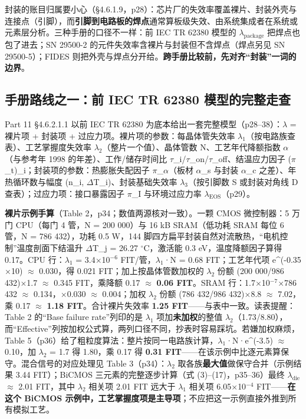 封装的账目归属要小心（§4.6.1.9，p28）：芯片厂的失效率覆盖裸片、封装外壳与连接点（引脚），而\textbf{引脚到电路板的焊点}通常算板级失效、由系统集成者在系统或元素层分析。三种手册的口径不一样：前 IEC TR 62380 模型的 \(\lambda_{\mathrm{package}}\) 把焊点也包了进去；SN 29500-2 的元件失效率含裸片与封装但不含焊点（焊点另见 SN 29500-5）；FIDES 则把外壳与焊点分开给。\textbf{跨手册比较前，先对齐“封装”一词的边界}。

\subsection{手册路线之一：前 IEC TR 62380 模型的完整走查}

Part 11 §4.6.2.1.1 以前 IEC TR 62380 为底本给出一套完整模型（p28–38）：\(\lambda\) = 裸片项 + 封装项 + 过应力项。裸片项的参数：每晶体管失效率 \(\lambda\)\(_{1}\)（按电路族查表）、工艺掌握度失效率 \(\lambda\)\(_{2}\)（整片一个值）、晶体管数 N、工艺年代降额指数 \(\alpha\)（与参考年 1998 的年差）、工作/储存时间比 \(\tau\)\_i/\(\tau\)\_on/\(\tau\)\_off、结温应力因子 (\(\pi\)\_t)\_i；封装项的参数：热膨胀失配因子 \(\pi\)\_\(\alpha\)（板材 \(\alpha\)\_s 与封装 \(\alpha\)\_c 之差）、年热循环数与幅度 (n\_i, \(\Delta\)T\_i)、封装基础失效率 \(\lambda\)\(_{3}\)（按引脚数 S 或封装对角线 D 查表）；过应力项：接口暴露因子 \(\pi\)\_I 与环境过应力率 \(\lambda_{\mathrm{EOS}}\)（p29）。

\textbf{裸片示例手算}（Table 2，p34；数值两源核对一致）。一颗 CMOS 微控制器：5 万门 CPU（每门 4 管，N = 200 000）与 16 kB SRAM（低功耗 SRAM 每位 6 管，N = 786 432），功耗 0.5 W，144 脚四方扁平封装自然对流散热，“电机控制”温度剖面下结温升 \(\Delta\)T\_j = 26.27 \(^{\circ}\)C，激活能 0.3 eV，温度降额因子算得 0.17。CPU 行：\(\lambda\)\(_{1}\) = 3.4\(\times\)10\(^{-6}\) FIT/管，\(\lambda\)\(_{1}\)·N = 0.68 FIT；工艺年代项 e\^{}(-0.35\(\times\)10) \(\approx\) 0.030，得 0.021 FIT；加上按晶体管数加权的 \(\lambda\)\(_{2}\) 份额 (200 000/986 432)\(\times\)1.7 \(\approx\) 0.345 FIT，乘降额 0.17 \(\approx\) \textbf{0.06 FIT}。SRAM 行：1.7\(\times\)10\(^{-7}\)\(\times\)786 432 \(\approx\) 0.134，\(\times\)0.030 \(\approx\) 0.004；加权 \(\lambda\)\(_{2}\) 份额 (786 432/986 432)\(\times\)8.8 \(\approx\) 7.02，乘 0.17 \(\approx\) \textbf{1.18 FIT}。合计裸片失效率 \textbf{1.25 FIT}——与表中一致。读表提醒：Table 2 的“Base failure rate”列印的是 \(\lambda\)\(_{1}\) 项加\textbf{未加权}的整值 \(\lambda\)\(_{2}\)（1.73/8.80），而“Effective”列按加权公式算，两列口径不同，抄表时容易踩坑。若嫌加权麻烦，Table 5（p36）给了粗粒度算法：整片按同一电路族计算，\(\lambda\)\(_{1}\)·N·e\^{}(-3.5) \(\approx\) 0.10，加 \(\lambda\)\(_{2}\) = 1.7 得 1.80，乘 0.17 得 \textbf{0.31 FIT}——在该示例中比逐元素算保守。混合信号的对应处理见 Table 3（p34）：\(\lambda\)\(_{2}\) 取各族\textbf{最大值}做保守合并（示例结果 3.44 FIT）；BiCMOS 三元素的完整逐步计算（式 (3)–(17)，p35–36）最终 \(\lambda_{\mathrm{die}}\) \(\approx\) 2.01 FIT，其中 \(\lambda\)\(_{2}\) 相关项 2.01 FIT 远大于 \(\lambda\)\(_{1}\) 相关项 6.05\(\times\)10\(^{-4}\) FIT——\textbf{在这个 BiCMOS 示例中，工艺掌握度项是主导项}；不应把这一示例直接外推到所有模拟工艺。

